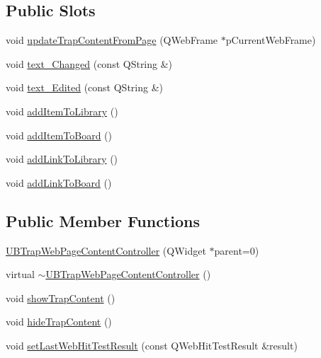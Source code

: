 \subsection*{Public Slots}
\begin{DoxyCompactItemize}
\item 
void \hyperlink{class_u_b_trap_web_page_content_controller_a723c26f80042de25a88dd7eea0783b64}{update\-Trap\-Content\-From\-Page} (Q\-Web\-Frame $\ast$p\-Current\-Web\-Frame)
\item 
void \hyperlink{class_u_b_trap_web_page_content_controller_a982e0527edb4098108cbee8c490e5fee}{text\-\_\-\-Changed} (const Q\-String \&)
\item 
void \hyperlink{class_u_b_trap_web_page_content_controller_ab2dccb1e52a6522aeffec66b9ec165de}{text\-\_\-\-Edited} (const Q\-String \&)
\item 
void \hyperlink{class_u_b_trap_web_page_content_controller_aeeadd8191948869553385407fe108983}{add\-Item\-To\-Library} ()
\item 
void \hyperlink{class_u_b_trap_web_page_content_controller_aa38367c349014b8a1064f03c1b9dc519}{add\-Item\-To\-Board} ()
\item 
void \hyperlink{class_u_b_trap_web_page_content_controller_a2c3abe64d01d7cc3b5e97e7dbf06cc4b}{add\-Link\-To\-Library} ()
\item 
void \hyperlink{class_u_b_trap_web_page_content_controller_a9e18874e464df8ae3ea8f154334bd758}{add\-Link\-To\-Board} ()
\end{DoxyCompactItemize}
\subsection*{Public Member Functions}
\begin{DoxyCompactItemize}
\item 
\hyperlink{class_u_b_trap_web_page_content_controller_a9e6cce9dd3467f7664d4233f2491bcf4}{U\-B\-Trap\-Web\-Page\-Content\-Controller} (Q\-Widget $\ast$parent=0)
\item 
virtual \hyperlink{class_u_b_trap_web_page_content_controller_afe6b79e5403c83238268af49263449f8}{$\sim$\-U\-B\-Trap\-Web\-Page\-Content\-Controller} ()
\item 
void \hyperlink{class_u_b_trap_web_page_content_controller_a6bf16d3424c93377578ab0fb31f97418}{show\-Trap\-Content} ()
\item 
void \hyperlink{class_u_b_trap_web_page_content_controller_ad748a9763752d340c6c6c3138e124ea3}{hide\-Trap\-Content} ()
\item 
void \hyperlink{class_u_b_trap_web_page_content_controller_a9c620d728fe53421fd1eee618c686334}{set\-Last\-Web\-Hit\-Test\-Result} (const Q\-Web\-Hit\-Test\-Result \&result)
\end{DoxyCompactItemize}


